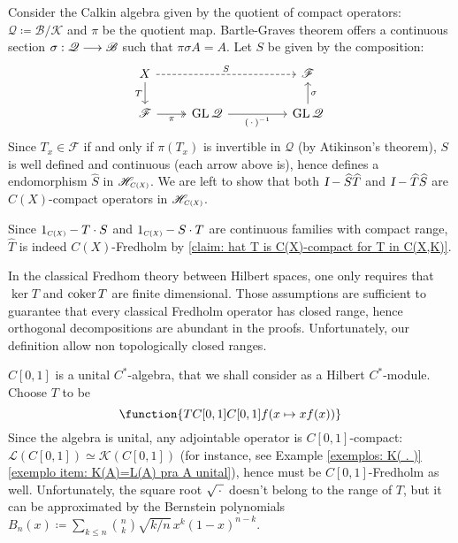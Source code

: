 \begin{exemplo}[\cite{239982}]
    Consider the Calkin algebra given by the quotient of compact operators: $\mathscr Q \coloneqq {\mathscr B}/{\mathscr K}$
    and $\pi$ be the quotient map. Bartle-Graves theorem offers a continuous section $\sigma : \mathscr Q \longrightarrow \mathscr B$ such that $\pi \sigma A = A$. Let $S$ be given by the composition: 
    \begin{equation*}
    \begin{tikzcd}
    X \arrow[d, "T"'] \arrow[rrr, dashed, "S"]      &   &  & \mathscr F \\
    \mathscr F \arrow[r, "\pi"', two heads] & \operatorname{GL}\mathscr Q \arrow[rr, "(\come)^{-1}"'] &  & \operatorname{GL}\mathscr Q \arrow[u, "\sigma"']
    \end{tikzcd}
    \end{equation*}
    Since $T_x\in \mathscr F$ if and only if $\pi(T_x)$ is invertible in $\mathscr Q$ (by Atikinson's theorem), $S$ is well defined and continuous (each arrow above is), hence defines a endomorphism $\widehat S$ in $\sub{\mathscr H}{C(X)}$. We are left to show that both $\textsl{I} - \widehat S\widehat T$ and $\textsl{I} - \widehat T\widehat S$ are $C(X)$-compact operators in $\sub{\mathscr H}{C(X)}$.

    Since $\sub1{C(X)} - T\cdot S$ and $\sub1{C(X)}-S\cdot T$ are continuous families with compact range, $\widehat T$ is indeed $C(X)$-Fredholm by \ref{claim: hat T is C(X)-compact for T in C(X,K)}.
\end{exemplo}

In the classical Fredhom theory between Hilbert spaces, one only requires that $\ker T$ and $\operatorname{coker} T$ are finite dimensional. Those assumptions are sufficient to guarantee that every classical Fredholm operator has closed range, hence orthogonal decompositions are abundant in the proofs. Unfortunately, our definition allow non topologically closed ranges.


\begin{exemplo}
    $C[0,1]$ is a unital $C^*$-algebra, that we shall consider as a Hilbert $C^*$-module. Choose $T$ to be
    \begin{equation*}
        \function{T{C[0,1]}{C[0,1]}{f}{(x \mapsto xf(x))}}
    \end{equation*}
    Since the algebra is unital, any adjointable operator is $C[0,1]$-compact: $\mathscr L(C[0,1]) \simeq \mathscr K(C[0,1])$ (for instance, see Example \ref{exemplos: K( . )}\ref{exemplo item: K(A)=L(A) pra A unital}), hence must be $C[0,1]$-Fredholm as well. Unfortunately, the square root $\sqrt{\operatorname{\,\cdot\,}}$ doesn't belong to the range of $T$, but it can be approximated by the Bernstein polynomials $B_n(x) \coloneqq \sum_{k\leqslant n} \binom nk \sqrt{k/n} \,x^k(1-x)^{n-k}$. 
\end{exemplo}

